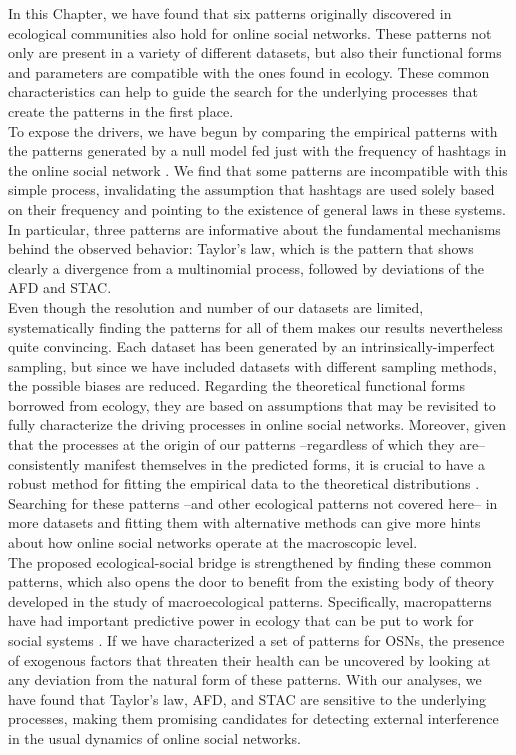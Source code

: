 In this Chapter, we have found that six patterns originally discovered in ecological communities also hold for online social networks. These patterns not only are present in a variety of different datasets, but also their functional forms and parameters are compatible with the ones found in ecology. These common characteristics can help to guide the search for the underlying processes that create the patterns in the first place. \\

To expose the drivers, we have begun by comparing the empirical patterns with the patterns generated by a null model fed just with the frequency of hashtags in the online social network \cite{lego}. We find that some patterns are incompatible with this simple process, invalidating the assumption that hashtags are used solely based on their frequency and pointing to the existence of general laws in these systems. In particular, three patterns are informative about the fundamental mechanisms behind the observed behavior: Taylor's law, which is the pattern that shows clearly a divergence from a multinomial process, followed by deviations of the AFD and STAC.\\

Even though the resolution and number of our datasets are limited, systematically finding the patterns for all of them makes our results nevertheless quite convincing. Each dataset has been generated by an intrinsically-imperfect sampling, but since we have included datasets with different sampling methods, the possible biases are reduced. Regarding the theoretical functional forms borrowed from ecology, they are based on assumptions that may be revisited to fully characterize the driving processes in online social networks. Moreover, given that the processes at the origin of our patterns --regardless of which they are-- consistently manifest themselves in the predicted forms, it is crucial to have a robust method for fitting the empirical data to the theoretical distributions \cite{leroi2020neutral}. Searching for these patterns --and other ecological patterns not covered here-- in more datasets and fitting them with alternative methods can give more hints about how online social networks operate at the macroscopic level. \\

The proposed ecological-social bridge is strengthened by finding these common patterns, which also opens the door to benefit from the existing body of theory developed in the study of macroecological patterns. Specifically, macropatterns have had important predictive power in ecology \cite{brown1995macroecology} that can be put to work for social systems \cite{tovo2021upscaling}. If we have characterized a set of patterns for OSNs, the presence of exogenous factors that threaten their health can be uncovered by looking at any deviation from the natural form of these patterns. With our analyses, we have found that Taylor's law, AFD, and STAC are sensitive to the underlying processes, making them promising candidates for detecting external interference in the usual dynamics of online social networks.